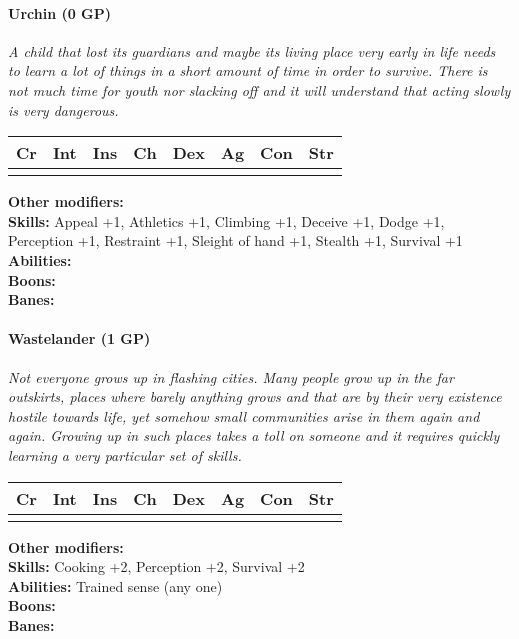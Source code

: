 \paragraph*{Urchin (0 GP)}
\textit{A child that lost its guardians and maybe its living place very early in life needs to learn a lot of things in a short amount of time in order to survive. There is not much time for youth nor slacking off and it will understand that acting slowly is very dangerous.}\par
\begin{tabular}{|l|l|l|l|l|l|l|l|}
	\hline
	Cr & Int & Ins & Ch & Dex & Ag & Con & Str \\ \hline
	&  &  &  &  &  &  &  \\ \hline
\end{tabular}\par
\noindent\textbf{Other modifiers:} \\
\textbf{Skills:} Appeal +1,
Athletics +1,
Climbing +1,
Deceive +1,
Dodge +1,
Perception +1,
Restraint +1,
Sleight of hand +1,
Stealth +1,
Survival +1\\
\textbf{Abilities:} \\
\textbf{Boons:} \\
\textbf{Banes:} \\

\hrulefill
\paragraph*{Wastelander (1 GP)}
\textit{Not everyone grows up in flashing cities. Many people grow up in the far outskirts, places where barely anything grows and that are by their very existence hostile towards life, yet somehow small communities arise in them again and again.
	Growing up in such places takes a toll on someone and it requires quickly learning a very particular set of skills.}\par
\begin{tabular}{|l|l|l|l|l|l|l|l|}
	\hline
	Cr & Int & Ins & Ch & Dex & Ag & Con & Str \\ \hline
	&  &  &  &  &  &  &  \\ \hline
\end{tabular}\par
\noindent\textbf{Other modifiers:} \\
\textbf{Skills:} Cooking +2,
Perception +2,
Survival +2\\
\textbf{Abilities:} Trained sense (any one)\\
\textbf{Boons:} \\
\textbf{Banes:} \\

